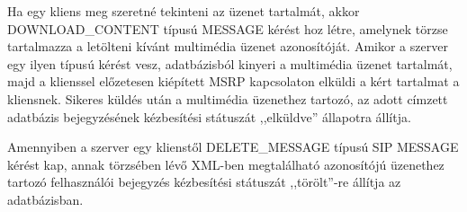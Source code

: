 Ha egy kliens meg szeretné tekinteni az üzenet tartalmát, akkor DOWNLOAD\_CONTENT típusú MESSAGE kérést hoz létre, amelynek törzse tartalmazza a letölteni kívánt multimédia üzenet azonosítóját. Amikor a szerver egy ilyen típusú kérést vesz, adatbázisból kinyeri a multimédia üzenet tartalmát, majd a klienssel előzetesen kiépített MSRP kapcsolaton elküldi a kért tartalmat a kliensnek. Sikeres küldés után a multimédia üzenethez tartozó, az adott címzett adatbázis bejegyzésének kézbesítési státuszát ,,elküldve'' állapotra állítja.

Amennyiben a szerver egy klienstől DELETE\_MESSAGE típusú SIP MESSAGE kérést kap, annak törzsében lévő XML-ben megtalálható azonosítójú üzenethez tartozó felhasználói bejegyzés kézbesítési státuszát ,,törölt''-re állítja az adatbázisban.  